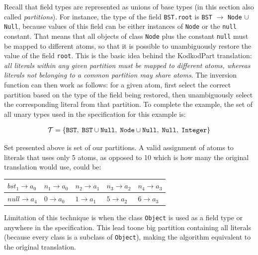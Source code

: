 \documentclass[11pt,twoside,a4paper]{book}
\begin{document}
Recall that field types are represented as unions of base types (in this section also
called \textit{partitions}). For instance, the type of the field \verb|BST.root|
is \verb|BST| $\rightarrow$ \verb|Node| $\cup$ \verb|Null|, because values of
this field can be either instances of \verb|Node| or the \verb|null| constant.
That means that all objects of class \verb|Node| plus the constant \verb|null|
must be mapped to different atoms, so that it is possible to unambiguously
restore the value of the field \verb|root|. This is the basic idea behind the
KodkodPart translation: \textit{all literals within any given partition must be
mapped to different atoms, whereas literals not belonging to a common partition may
share atoms}. The inversion function can then work as follows: for a given atom,
first select the correct partition based on the type of the field being
restored, then unambiguously select the corresponding literal from that
partition. To complete the example, the set of all unary types used in the
specification for this example is:

\begin{center}
\begin{align*}
	\mathcal{T}& =\{\texttt{BST},\hspace{1mm}
	\texttt{BST}\cup\texttt{Null},\hspace{1mm} \texttt{Node} \cup \texttt{Null},
	\hspace{1mm} \texttt{Null},\hspace{1mm} \texttt{Integer}\}\\
\end{align*}
\end{center}

Set presented above is set of our partitions. A valid assignment of
atoms to literals that uses only 5 atoms, as opposed to 10 which is how many the
original translation would use, could be:

\begin{center}
\begin{tabular}{|l|l|l|l|l|}
  \hline
  $bst_1 \rightarrow a_0$ & $n_1 \rightarrow a_0$ & $n_2 \rightarrow a_1$ & $n_3
  \rightarrow a_2$ & $n_4 \rightarrow a_3$\\
  \hline
  $null \rightarrow a_4$ & $0 \rightarrow a_0$ & $1 \rightarrow a_1$ & $5
  \rightarrow a_2$ & $6 \rightarrow a_3$\\
  \hline
  \end{tabular}
\end{center}

Limitation of this technique is when the class \verb|Object| is used as a field
type or anywhere in the specification. This lead toone big partition containing
all literals (because every class is a subclass of \verb|Object|), making the
algorithm equivalent to the original translation.
\end{document}
